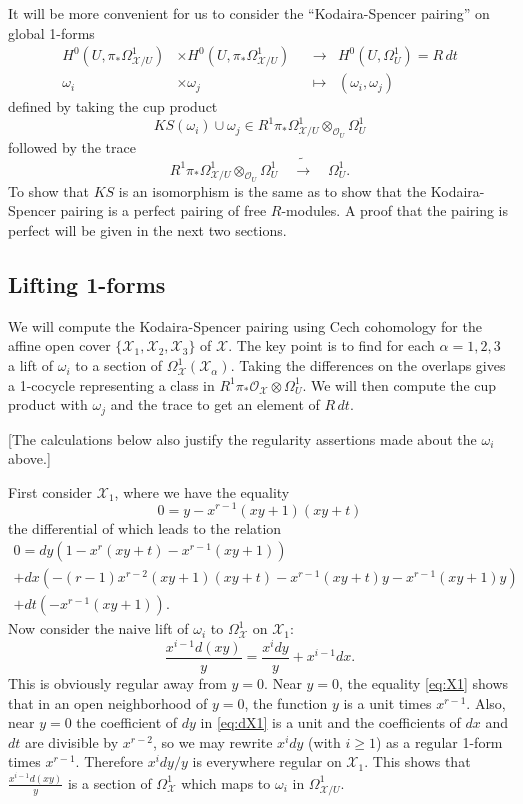 \documentclass[reqno]{amsart}
\theoremstyle{definition}
\theoremstyle{remark}
\def\XX{\mathcal{X}}
\def\OO{\mathcal{O}}
\def\isoto{\tilde{\to}}
\def\tensor{\otimes}
\begin{document}
It will be more convenient for us to consider the ``Kodaira-Spencer
pairing'' on global 1-forms 
\begin{align*}
H^0(U,\pi_*\Omega^1_{\XX/U})&\times H^0(U,\pi_*\Omega^1_{\XX/U})&&\to&
H^0(U,\Omega^1_U)=R\,dt\\
\omega_i&\times\omega_j&&\mapsto&(\omega_i,\omega_j)\qquad
\end{align*}
defined by taking the cup product
$$KS(\omega_i)\cup\omega_j
\in R^1\pi_*\Omega^1_{\XX/U}\tensor_{\OO_U}\Omega^1_U$$
followed by the trace
$$ R^1\pi_*\Omega^1_{\XX/U}\tensor_{\OO_U}\Omega^1_U\quad\isoto\quad \Omega^1_U.$$
To show that $KS$ is an isomorphism is the same as to show that the
Kodaira-Spencer pairing is a perfect pairing of free $R$-modules. A
proof that the pairing is perfect will be given in the next two
sections.

\subsection{Lifting 1-forms}
We will compute the Kodaira-Spencer pairing using Cech cohomology for the affine open
cover $\{\XX_1,\XX_2,\XX_3\}$ of $\XX$. The key point is to find for
each $\alpha=1,2,3$ a lift of $\omega_i$ to a section of
$\Omega^1_{\XX}(\XX_\alpha)$. Taking the differences on the overlaps
gives a 1-cocycle representing a class in
$R^1\pi_*\OO_\XX\tensor\Omega^1_U$. We will then compute the cup
product with $\omega_j$ and the trace to get an element of $R\,dt$.

[The calculations below also justify the regularity assertions made
about the $\omega_i$ above.]

First consider $\XX_1$, where we have the equality
\begin{equation}\label{eq:X1}
0=y-x^{r-1}(xy+1)(xy+t)
\end{equation}
the differential of which leads to the relation
\begin{multline}\label{eq:dX1}
0=dy\left(1-x^r(xy+t)-x^{r-1}(xy+1)\right)\\
+dx\left(-(r-1)x^{r-2}(xy+1)(xy+t)-x^{r-1}(xy+t)y-x^{r-1}(xy+1)y\right)\\
+dt\left(-x^{r-1}(xy+1)\right).
\end{multline}
Now consider the naive lift of $\omega_i$ to $\Omega^1_{\XX}$ on $\XX_1$:
$$\frac{x^{i-1}d(xy)}{y}=\frac{x^idy}{y}+x^{i-1}dx.$$
This is obviously regular away from $y=0$. Near $y=0$, the equality
\eqref{eq:X1} shows that in an open neighborhood of $y=0$, the
function $y$ is a unit times $x^{r-1}$. Also, near $y=0$ the
coefficient of $dy$ in \eqref{eq:dX1} is a unit and the coefficients of $dx$
and $dt$ are divisible by $x^{r-2}$, so we may rewrite $x^idy$ (with
$i\ge1$) as a regular 1-form times $x^{r-1}$. Therefore $x^{i}dy/y$ is
everywhere regular on $\XX_1$. This shows that
$\frac{x^{i-1}d(xy)}{y}$ is a section of $\Omega^1_{\XX}$ which maps
to $\omega_i$ in $\Omega^1_{\XX/U}$.
\end{document}
